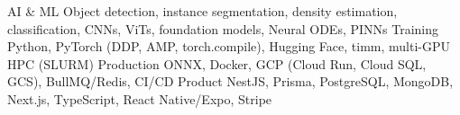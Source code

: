 \begin{cvskills}
  \cvskill
    {AI \& ML}
    {Object detection, instance segmentation, density estimation, classification, CNNs, ViTs, foundation models, Neural ODEs, PINNs}
  \cvskill
    {Training}
    {Python, PyTorch (DDP, AMP, torch.compile), Hugging Face, timm, multi-GPU HPC (SLURM)}
  \cvskill
    {Production}
    {ONNX, Docker, GCP (Cloud Run, Cloud SQL, GCS), BullMQ/Redis, CI/CD}
  \cvskill
    {Product}
    {NestJS, Prisma, PostgreSQL, MongoDB, Next.js, TypeScript, React Native/Expo, Stripe}
\end{cvskills}
